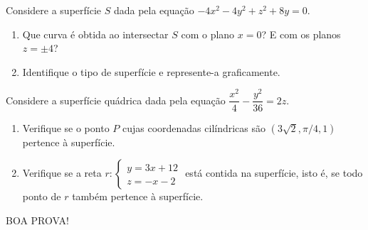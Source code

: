 \documentclass[12pt,a4paper]{article}
\newcommand{\fixme}{{\color{red}(...)}}
\begin{document}
\begin{ExerciseList}
\Answer \fixme

\Exercise[title={2,5}]
Considere a superfície $S$ dada pela equação $-4x^2 - 4y^2 + z^2 + 8y = 0$.
\begin{enumerate}
\item Que curva é obtida ao intersectar $S$ com o plano $x=0$? E com os planos $z=\pm4$?
\item Identifique o tipo de superfície e represente-a graficamente.
\end{enumerate}
\Answer \fixme

\Exercise[title={2,5}] Considere a superfície quádrica dada pela equação $\dfrac{x^2}{4}-\dfrac{y^2}{36} = 2z$.
\begin{enumerate}
\item Verifique se o ponto $P$ cujas coordenadas cilíndricas são $(3\sqrt{2}, \pi/4, 1)$ pertence à superfície.
\item Verifique se a reta $r:\begin{cases}y=3x+12\\z=-x-2\end{cases}$ está contida na superfície, isto é, se todo ponto de $r$ também pertence à superfície.
\end{enumerate}
\Answer \fixme
\end{ExerciseList}

\begin{center}
BOA PROVA!
\end{center}

\restoregeometry
\end{document}
